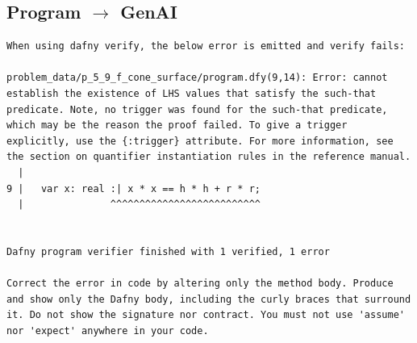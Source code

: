 \documentclass{article}
\begin{document}
\subsection*{Program $\rightarrow$ GenAI}
\begin{lstlisting}
When using dafny verify, the below error is emitted and verify fails:

problem_data/p_5_9_f_cone_surface/program.dfy(9,14): Error: cannot establish the existence of LHS values that satisfy the such-that predicate. Note, no trigger was found for the such-that predicate, which may be the reason the proof failed. To give a trigger explicitly, use the {:trigger} attribute. For more information, see the section on quantifier instantiation rules in the reference manual.
  |
9 |   var x: real :| x * x == h * h + r * r;
  |               ^^^^^^^^^^^^^^^^^^^^^^^^^^


Dafny program verifier finished with 1 verified, 1 error

Correct the error in code by altering only the method body. Produce and show only the Dafny body, including the curly braces that surround it. Do not show the signature nor contract. You must not use 'assume' nor 'expect' anywhere in your code.
\end{lstlisting}
\end{document}
